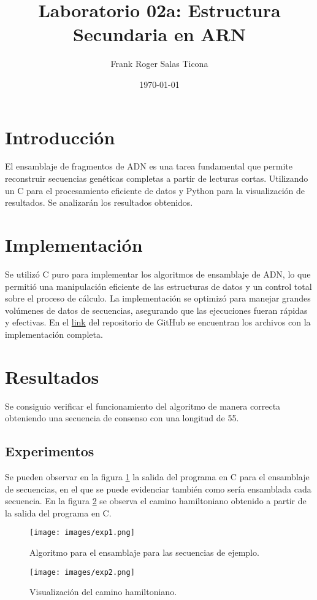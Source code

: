 \documentclass{article}
\title{Laboratorio 02a: Estructura Secundaria en ARN}
\author{Frank Roger Salas Ticona}
\date{\today}
\begin{document}
\maketitle

\section{Introducción}
El ensamblaje de fragmentos de ADN es una tarea fundamental que permite reconstruir secuencias genéticas completas a partir de lecturas cortas. Utilizando un  C para el procesamiento eficiente de datos y Python para la visualización de resultados. Se analizarán los resultados obtenidos.

\section{Implementación}
Se utilizó C puro para implementar los algoritmos de ensamblaje de ADN, lo que permitió una manipulación eficiente de las estructuras de datos y un control total sobre el proceso de cálculo. La implementación se optimizó para manejar grandes volúmenes de datos de secuencias, asegurando que las ejecuciones fueran rápidas y efectivas. En el \href{https://github.com/DaereanLegrand/DNA-assembly.git}{link} del repositorio de GitHub se encuentran los archivos con la implementación completa.

\section{Resultados}
Se consiguio verificar el funcionamiento del algoritmo de manera correcta obteniendo una secuencia de consenso con una longitud de 55.

\subsection{Experimentos}
Se pueden observar en la figura \ref{fig:code1} la salida del programa en C para el ensamblaje de secuencias, en el que se puede evidenciar también como sería ensamblada cada secuencia. En la figura \ref{fig:code2} se observa el camino hamiltoniano obtenido a partir de la salida del programa en C.

\begin{figure}[!htbp]
    \centering
    \texttt{[image: images/exp1.png]}
    \caption{Algoritmo para el ensamblaje para las secuencias de ejemplo.}
    \label{fig:code1}
\end{figure}
\begin{figure}[!htbp]
    \centering
    \texttt{[image: images/exp2.png]}
    \caption{Visualización del camino hamiltoniano.}
    \label{fig:code2}
\end{figure}
\end{document}
